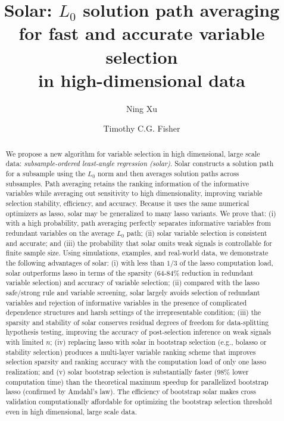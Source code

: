 \documentclass[11pt,review,authoryear]{elsarticle}
\begin{document}
\title{Solar: $L_0$ solution path averaging for fast and accurate variable selection\\ in high-dimensional data}

\author{Ning Xu}
\address{School of Economics, University of Sydney, Australia}

\author{Timothy C.G. Fisher}
\address{School of Economics, University of Sydney, Australia}


\begin{abstract}
%
We propose a new algorithm for variable selection in high dimensional, large scale data: \emph{subsample-ordered least-angle regression (solar)}. Solar constructs a solution path for a subsample using the $L_0$ norm and then averages solution paths across subsamples. Path averaging retains the ranking information of the informative variables while averaging out sensitivity to high dimensionality, improving variable selection stability, efficiency, and accuracy. Because it uses the same numerical optimizers as lasso, solar may be generalized to many lasso variants. We prove that: (i) with a high probability, path averaging perfectly separates informative variables from redundant variables on the average $L_0$ path; (ii) solar variable selection is consistent and accurate; and (iii) the probability that solar omits weak signals is controllable for finite sample size. Using simulations, examples, and real-world data, we demonstrate the following advantages of solar: (i) with less than $1/3$ of the lasso computation load, solar outperforms lasso in terms of the sparsity (64-84\% reduction in redundant variable selection) and accuracy of variable selection; (ii) compared with the lasso safe/strong rule and variable screening, solar largely avoids selection of redundant variables and rejection of informative variables in the presence of complicated dependence structures and harsh settings of the irrepresentable condition; (iii) the sparsity and stability of solar conserves residual degrees of freedom for data-splitting hypothesis testing, improving the accuracy of post-selection inference on weak signals with limited $n$; (iv) replacing lasso with solar in bootstrap selection (e.g., bolasso or stability selection) produces a multi-layer variable ranking scheme that improves selection sparsity and ranking accuracy with the computation load of only one lasso realization; and (v) solar bootstrap selection is substantially faster (98\% lower computation time) than the theoretical maximum speedup for parallelized bootstrap lasso (confirmed by Amdahl's law). The efficiency of bootstrap solar makes cross validation computationally affordable for optimizing the bootstrap selection threshold even in high dimensional, large scale data.
%
\end{abstract}
\end{document}
